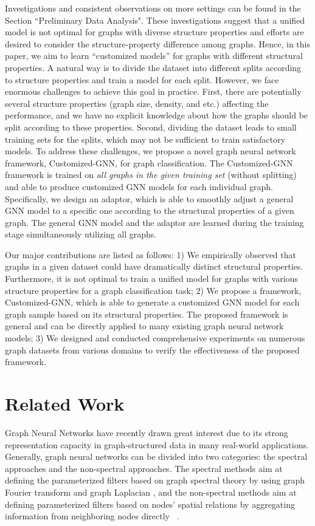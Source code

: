 \documentclass[11pt,dvipdfm]{article}
\begin{document}
Investigations and consistent observations on more settings can be found in the Section ``Preliminary Data Analysis". 
These investigations suggest that a unified model is not optimal for graphs with diverse structure properties and efforts are desired to consider the structure-property difference among graphs. Hence, in this paper, we aim to learn ``customized models'' for graphs with different structural properties. 
A natural way is to divide the dataset into different splits according to structure properties and train a model for each split. However, we face enormous challenges to achieve this goal in practice. First, there are potentially several structure properties (graph size, density, and etc.) affecting the performance, and we have no explicit knowledge about how the graphs should be split according to these properties. Second, dividing the dataset leads to small training sets for the splits, which may not be sufficient to train satisfactory models.
To address these challenges, we propose a novel graph neural network framework, Customized-GNN, for graph classification. The Customized-GNN framework is trained on \emph{all graphs in the given training set} (without splitting) and able to produce customized GNN models for each individual graph. Specifically, we design an adaptor, which is able to smoothly adjust a general GNN model to a specific one according to the structural properties of a given graph. The general GNN model and the adaptor are learned during the training stage simultaneously utilizing all graphs. 

Our major contributions are listed as follows: 1) We empirically observed that graphs in a given dataset could have dramatically distinct structural properties. Furthermore, it is not optimal to train a unified model for graphs with various structure properties for a graph classification task;
2) We propose a framework, Customized-GNN, which is able to generate a customized GNN model for each graph sample based on its structural properties. The proposed framework is general and can be directly applied to many existing graph neural network models;
3) We designed and conducted comprehensive experiments on numerous graph datasets from various domains to verify the effectiveness of the proposed framework.

\section{Related Work}\label{sec:yiqi_related work}
Graph Neural Networks have recently drawn great interest due to its strong representation capacity in graph-structured data in many real-world applications. Generally, graph neural networks can be divided into two categories: the spectral approaches and the non-spectral approaches. The spectral methods aim at defining the parameterized filters based on graph spectral theory by using graph Fourier transform and graph Laplacian \cite{BrunaZSL13,defferrard2016convolutional,li2018adaptive,KipfW17}, and the non-spectral methods aim at defining parameterized filters based on nodes' spatial relations by aggregating information from neighboring nodes directly ~\cite{hamilton2017inductive,VelickovicCCRLB18}. 
\end{document}
